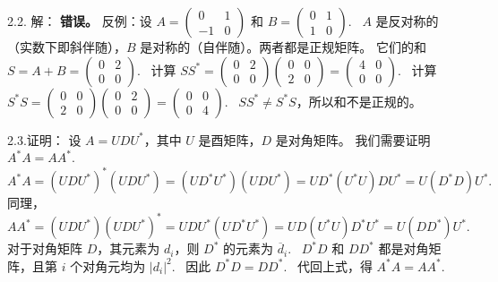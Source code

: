 \begin{exer}
2.2. 解：
\textbf{错误。}
反例：设 $A = \begin{pmatrix} 0 & 1 \\ -1 & 0 \end{pmatrix}$ 和 $B = \begin{pmatrix} 0 & 1 \\ 1 & 0 \end{pmatrix}$.~
$A$ 是反对称的（实数下即斜伴随），$B$ 是对称的（自伴随）。两者都是正规矩阵。
它们的和 $S = A+B = \begin{pmatrix} 0 & 2 \\ 0 & 0 \end{pmatrix}$.~
计算 $S S^* = \begin{pmatrix} 0 & 2 \\ 0 & 0 \end{pmatrix} \begin{pmatrix} 0 & 0 \\ 2 & 0 \end{pmatrix} = \begin{pmatrix} 4 & 0 \\ 0 & 0 \end{pmatrix}$.~
计算 $S^* S = \begin{pmatrix} 0 & 0 \\ 2 & 0 \end{pmatrix} \begin{pmatrix} 0 & 2 \\ 0 & 0 \end{pmatrix} = \begin{pmatrix} 0 & 0 \\ 0 & 4 \end{pmatrix}$.~
$S S^* \neq S^* S$，所以和不是正规的。

2.3.证明：
设 $A = UDU^*$，其中 $U$ 是酉矩阵，$D$ 是对角矩阵。
我们需要证明 $A^*A = AA^*$.~
$$ A^*A = (UDU^*)^* (UDU^*) = (U D^* U^*) (U D U^*) = U D^* (U^* U) D U^* = U (D^* D) U^*. $$
同理，
$$ AA^* = (UDU^*) (UDU^*)^* = U D U^* (U D^* U^*) = U D (U^* U) D^* U^* = U (D D^*) U^*. $$
对于对角矩阵 $D$，其元素为 $d_i$，则 $D^*$ 的元素为 $\overline{d}_i$.~
$D^*D$ 和 $DD^*$ 都是对角矩阵，且第 $i$ 个对角元均为 $|d_i|^2$.~
因此 $D^*D = DD^*$.~
代回上式，得 $A^*A = AA^*$.~


\end{exer}

